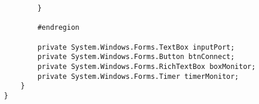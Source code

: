 \begin{verbatim}
            }

            #endregion

            private System.Windows.Forms.TextBox inputPort;
            private System.Windows.Forms.Button btnConnect;
            private System.Windows.Forms.RichTextBox boxMonitor;
            private System.Windows.Forms.Timer timerMonitor;
        }
    }
\end{verbatim}
